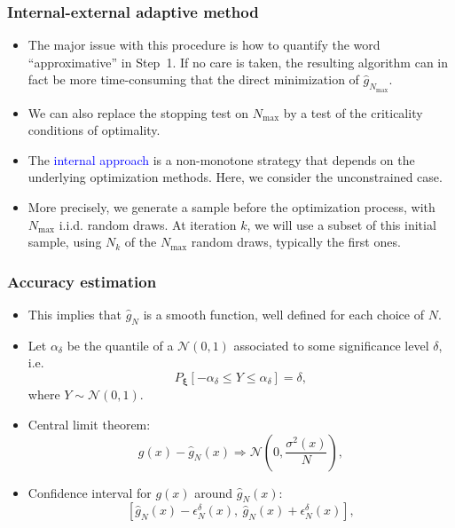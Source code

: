 \documentclass{beamer}
\def\bxi{\boldsymbol\xi}
\def\cN{\mathcal{N}}
\begin{document}
\begin{frame}
\frametitle{Internal-external adaptive method}

\begin{itemize}
	\item 
The major issue with this procedure is how to quantify the word ``approximative'' in Step~1.
If no care is taken, the resulting algorithm can in fact be more time-consuming that the direct minimization of $\hat{g}_{N_{\max}}$.
\item
We can also replace the stopping test on $N_{\max}$ by a test of the criticality conditions of optimality.
\item 
The \textcolor{blue}{internal approach} is a non-monotone strategy that depends on the underlying optimization methods.
Here, we consider the unconstrained case.
\item 
More precisely, we generate a sample before the optimization process, with $N_{\max}$ i.i.d. random draws.
At iteration $k$, we will use a subset of this initial sample, using $N_k$ of the $N_{\max}$ random draws, typically the first ones.
\end{itemize}

\end{frame}

\begin{frame}
\frametitle{Accuracy estimation}

\begin{itemize}
	\item 
This implies that $\hat{g}_N$ is a smooth function, well defined for each choice of $N$.
\item
Let $\alpha_{\delta}$ be the quantile of a $\cN(0,1)$ associated to some significance level $\delta$, i.e.
$$
P_{\bxi} [ -\alpha_{\delta} \leq Y \leq \alpha_{\delta} ] = \delta,
$$
where $Y \sim \cN(0,1)$.
\item
Central limit theorem:
\[
g(x) - \hat{g}_N(x) \Rightarrow \cN \left( 0, \frac{\sigma^2(x)}{N} \right),
\]
\item
Confidence interval for $g(x)$ around $\hat{g}_N(x)$:
\[
[\hat{g}_N(x) - \epsilon^{\delta}_N(x),\ \hat{g}_N(x) + \epsilon^{\delta}_N(x)],
\]
\end{itemize}

\end{frame}
\end{document}
